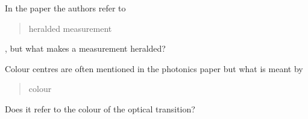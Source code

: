 \documentclass{alex_summary}
\begin{document}
\begin{question1}
	In the paper the authors refer to \blockquote{heralded measurement}, but what makes a measurement heralded?
\end{question1}

\begin{question3}
	Colour centres are often mentioned in the photonics paper but what is meant by \blockquote{colour}? Does it refer to the colour of the optical transition?
\end{question3}

\printbibliography
\end{document}
